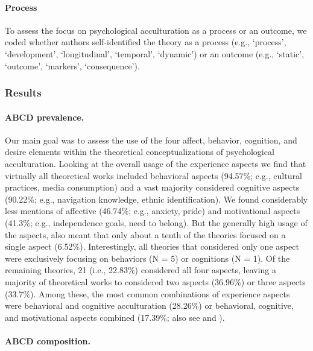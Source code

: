 \paragraph{Process}

To assess the focus on psychological acculturation as a process or an
outcome, we coded whether authors self-identified the theory as a
process (e.g., `process', `development', `longitudinal', `temporal',
`dynamic') or an outcome (e.g., `static', `outcome', `markers',
`consequence').

\subsubsection{Results}

\paragraph{ABCD prevalence.}

Our main goal was to assess the use of the four affect, behavior,
cognition, and desire elements within the theoretical conceptualizations
of psychological acculturation. Looking at the overall usage of the
experience aspects we find that virtually all theoretical works included
behavioral aspects (94.57\%; e.g., cultural practices, media
consumption) and a vast majority considered cognitive aspects (90.22\%;
e.g., navigation knowledge, ethnic identification). We found
considerably less mentions of affective (46.74\%; e.g., anxiety, pride)
and motivational aspects (41.3\%; e.g., independence goals, need to
belong). But the generally high usage of the aspects, also meant that
only about a tenth of the theories focused on a single aspect (6.52\%).
Interestingly, all theories that considered only one aspect were
exclusively focusing on behaviors (N = 5) or cognitions (N = 1). Of the
remaining theories, 21 (i.e., 22.83\%) considered all four aspects,
leaving a majority of theoretical works to considered two aspects
(36.96\%) or three aspects (33.7\%). Among these, the most common
combinations of experience aspects were behavioral and cognitive
acculturation (28.26\%) or behavioral, cognitive, and motivational
aspects combined (17.39\%; also see  and
).

\paragraph{ABCD composition.}


